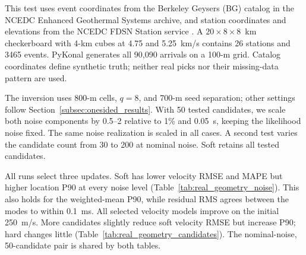 This test uses event coordinates from the Berkeley Geysers (BG) catalog in the NCEDC Enhanced Geothermal Systems archive, and station coordinates and elevations from the NCEDC FDSN Station service \parencite{ncedc2014}. A $20\times8\times8$~km checkerboard with 4-km cubes at 4.75 and 5.25~km/s contains 26 stations and 3465 events. PyKonal generates all 90,090 arrivals on a 100-m grid. Catalog coordinates define synthetic truth; neither real picks nor their missing-data pattern are used.

The inversion uses 800-m cells, $q=8$, and 700-m seed separation; other settings follow Section~\ref{subsec:onesided_results}. With 50 tested candidates, we scale both noise components by 0.5--2 relative to 1\% and 0.05~s, keeping the likelihood noise fixed. The same noise realization is scaled in all cases. A second test varies the candidate count from 30 to 200 at nominal noise. Soft retains all tested candidates.

All runs select three updates. Soft has lower velocity RMSE and MAPE but higher location P90 at every noise level (Table~\ref{tab:real_geometry_noise}). This also holds for the weighted-mean P90, while residual RMS agrees between the modes to within 0.1~ms. All selected velocity models improve on the initial 250~m/s. More candidates slightly reduce soft velocity RMSE but increase P90; hard changes little (Table~\ref{tab:real_geometry_candidates}). The nominal-noise, 50-candidate pair is shared by both tables.

